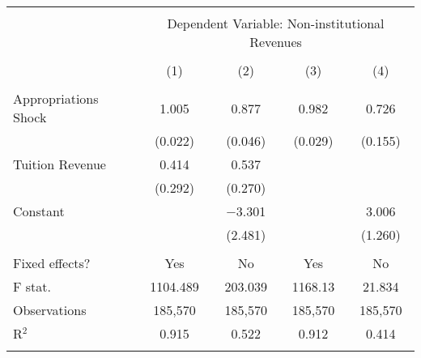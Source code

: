 
\begin{tabular}{@{\extracolsep{5pt}}lcccc} 
\\[-1.8ex]\hline 
\hline \\[-1.8ex] 
 & \multicolumn{4}{c}{Dependent Variable: Non-institutional Revenues} \\ 
\cline{2-5} 
\\[-1.8ex] & (1) & (2) & (3) & (4)\\ 
\hline \\[-1.8ex] 
 Appropriations Shock & 1.005 & 0.877 & 0.982 & 0.726 \\ 
  & (0.022) & (0.046) & (0.029) & (0.155) \\ 
  Tuition Revenue & 0.414 & 0.537 &  &  \\ 
  & (0.292) & (0.270) &  &  \\ 
  Constant &  & $-$3.301 &  & 3.006 \\ 
  &  & (2.481) &  & (1.260) \\ 
 \hline \\[-1.8ex] 
Fixed effects? & Yes & No & Yes & No \\ 
F stat. & 1104.489 & 203.039 & 1168.13 & 21.834 \\ 
Observations & 185,570 & 185,570 & 185,570 & 185,570 \\ 
R$^{2}$ & 0.915 & 0.522 & 0.912 & 0.414 \\ 
\hline 
\hline \\[-1.8ex] 
\end{tabular} 
